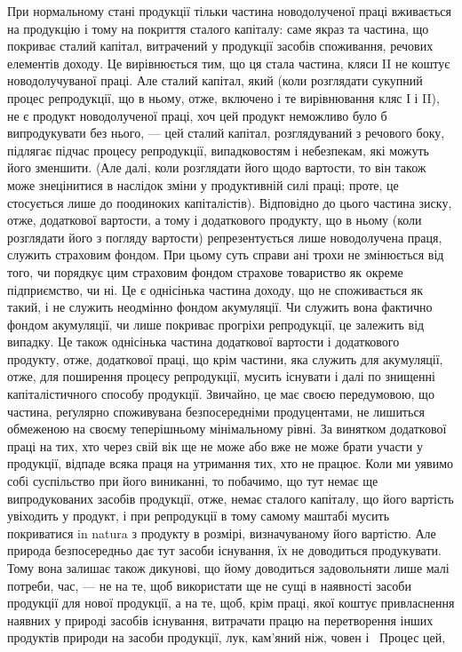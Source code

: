 При нормальному стані продукції тільки частина новодолученої праці
вживається на продукцію і тому на покриття сталого капіталу: саме якраз та
частина, що покриває сталий капітал, витрачений у продукції засобів споживання,
речових елементів доходу. Це вирівнюється тим, що ця стала частина,
кляси II не коштує новодолучуваної праці. Але сталий капітал, який (коли розглядати
сукупний процес репродукції, що в ньому, отже, включено і те вирівнювання
кляс І і II), не є продукт новодолученої праці, хоч цей продукт неможливо
було б випродукувати без нього, — цей сталий капітал, розглядуваний з речового
боку, підлягає підчас процесу репродукції, випадковостям і небезпекам,
які можуть його зменшити. (Але далі, коли розглядати його щодо вартости, то
він також може знецінитися в наслідок зміни у продуктивній силі праці;
проте, це стосується лише до поодиноких капіталістів). Відповідно до цього частина
зиску, отже, додаткової вартости, а тому і додаткового продукту, що в ньому
(коли розглядати його з погляду вартости) репрезентується лише новодолучена
праця, служить страховим фондом. При цьому суть справи ані трохи не змінюється
від того, чи порядкує цим страховим фондом страхове товариство як
окреме підприємство, чи ні. Це є однісінька частина доходу, що не споживається
як такий, і не служить неодмінно фондом акумуляції. Чи служить вона фактично
фондом акумуляції, чи лише покриває прогріхи репродукції, це залежить від
випадку. Це також однісінька частина додаткової вартости і додаткового продукту,
отже, додаткової праці, що крім частини, яка служить для акумуляції, отже,
для поширення процесу репродукції, мусить існувати і далі по знищенні
капіталістичного способу продукції. Звичайно, це має своєю передумовою, що
частина, реґулярно споживувана безпосередніми продуцентами, не лишиться обмеженою на своєму
теперішньому мінімальному рівні. За винятком додаткової
праці на тих, хто через свій вік ще не може або вже не може брати участи у продукції,
відпаде всяка праця на утримання тих, хто не працює. Коли ми уявимо
собі суспільство при його виниканні, то побачимо, що тут немає ще випродукованих
засобів продукції, отже, немає сталого капіталу, що його вартість увіходить
у продукт, і при репродукції в тому самому маштабі мусить покриватися
in natura з продукту в розмірі, визначуваному його вартістю. Але природа
безпосередньо дає тут засоби існування, їх не доводиться продукувати. Тому
вона залишає також дикунові, що йому доводиться задовольняти лише малі потреби,
час, — не на те, щоб використати ще не сущі в наявності засоби продукції для
нової продукції, а на те, щоб, крім праці, якої коштує привласнення наявних
у природі засобів існування, витрачати працю на перетворення інших продуктів
природи на засоби продукції, лук, кам’яний ніж, човен і~ Процес цей,
\parbreak{}  %
